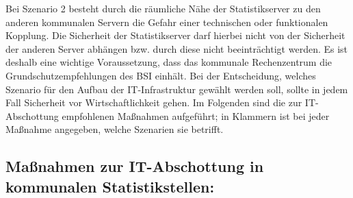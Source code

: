 Bei Szenario 2 besteht durch die räumliche Nähe der Statistikserver zu den anderen kommunalen Servern die Gefahr einer technischen oder funktionalen Kopplung. Die Sicherheit der Statistikserver darf hierbei nicht von der Sicherheit der anderen Server abhängen bzw. durch diese nicht beeinträchtigt werden. Es ist deshalb eine wichtige Voraussetzung, dass das kommunale Rechenzentrum die Grundschutzempfehlungen des BSI einhält. Bei der Entscheidung, welches Szenario für den Aufbau der IT-Infrastruktur gewählt werden soll, sollte in jedem Fall Sicherheit vor Wirtschaftlichkeit gehen. Im Folgenden sind die zur IT-Abschottung empfohlenen Maßnahmen aufgeführt; in Klammern ist bei jeder Maßnahme angegeben, welche Szenarien sie betrifft.
    \subsection{Maßnahmen zur IT-Abschottung in kommunalen Statistikstellen:}
